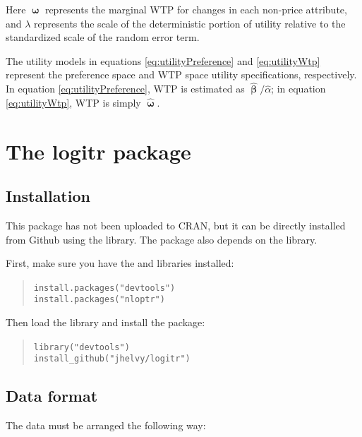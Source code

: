 \documentclass[article]{jss}
\begin{document}


Here \(\boldsymbol\upomega\) represents the marginal WTP for changes in
each non-price attribute, and \(\lambda\) represents the scale of the
deterministic portion of utility relative to the standardized scale of
the random error term.

The utility models in equations \ref{eq:utilityPreference} and
\ref{eq:utilityWtp} represent the preference space and WTP space utility
specifications, respectively. In equation \ref{eq:utilityPreference},
WTP is estimated as \(\hat{\boldsymbol\upbeta} / \hat{\alpha}\); in
equation \ref{eq:utilityWtp}, WTP is simply
\(\hat{\boldsymbol\upomega}\).

\hypertarget{the-logitr-package}{%
\section{The logitr package}\label{the-logitr-package}}

\hypertarget{installation}{%
\subsection{Installation}\label{installation}}

This package has not been uploaded to CRAN, but it can be directly
installed from Github using the  library. The package also
depends on the  library.

First, make sure you have the  and  libraries
installed:

\begin{quote}
\texttt{install.packages("devtools")}~\\
\texttt{install.packages("nloptr")}
\end{quote}

Then load the  library and install the 
package:

\begin{quote}
\texttt{library("devtools")}~\\
\texttt{install\_github("jhelvy/logitr")}
\end{quote}

\hypertarget{data-format}{%
\subsection{Data format}\label{data-format}}

The data must be arranged the following way:
\end{document}
